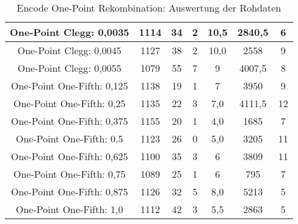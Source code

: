 \begin{table}[H]
\begin{tabular}{c | c | c | c | c | c | c}
		\hline
		One-Point Clegg: 0,0035 & 1114 & 34 & 2 & 10,5 & 2840,5 & 6\\
		\hline
		One-Point Clegg: 0,0045 & 1127 & 38 & 2 & 10,0 & 2558 & 9\\
		\hline
		One-Point Clegg: 0,0055 & 1079 & 55 & 7 & 9 & 4007,5 & 8\\
		\hline
		One-Point One-Fifth: 0,125 & 1138 & 19 & 1 & 7 & 3950 & 9\\
		\hline
		One-Point One-Fifth: 0,25 & 1135 & 22 & 3 & 7,0 & 4111,5 & 12\\
		\hline
		One-Point One-Fifth: 0,375 & 1155 & 20 & 1 & 4,0 & 1685 & 7\\
		\hline
		One-Point One-Fifth: 0,5 & 1123 & 26 & 0 & 5,0 & 3205 & 11\\
		\hline
		One-Point One-Fifth: 0,625 & 1100 & 35 & 3 & 6 & 3809 & 11\\
		\hline
		One-Point One-Fifth: 0,75 & 1089 & 25 & 1 & 6 & 795 & 7\\
		\hline
		One-Point One-Fifth: 0,875 & 1126 & 32 & 5 & 8,0 & 5213 & 5\\
		\hline
		One-Point One-Fifth: 1,0 & 1112 & 42 & 3 & 5,5 & 2863 & 5\\
	\end{tabular}
	\caption{Encode One-Point Rekombination: Auswertung der Rohdaten}
	\label{table:encodeOnePointRohdaten}
\end{table}

